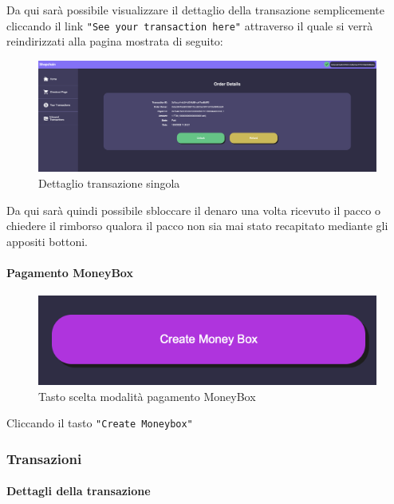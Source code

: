             Da qui sarà possibile visualizzare il dettaglio della transazione semplicemente cliccando il link \texttt{"See your transaction here"} attraverso il quale si verrà reindirizzati alla pagina mostrata di seguito:
            \begin{figure}[H]
                \centering
                \includegraphics[scale=0.2]{immagini/Checkout/SinglePaymentDetails.png}
                \caption{Dettaglio transazione singola}
            \end{figure}
            Da qui sarà quindi possibile sbloccare il denaro una volta ricevuto il pacco o chiedere il rimborso qualora il pacco non sia mai stato recapitato mediante gli appositi bottoni.



            \paragraph{Pagamento MoneyBox}
            \begin{figure}[H]
                \centering
                \includegraphics[scale=0.3]{immagini/Checkout/CreateMoneyBox.png}
                \caption{Tasto scelta modalità pagamento MoneyBox}
            \end{figure}
            Cliccando il tasto \texttt{"Create Moneybox"}





        \subsubsection{Transazioni}


            \paragraph{Dettagli della transazione}

